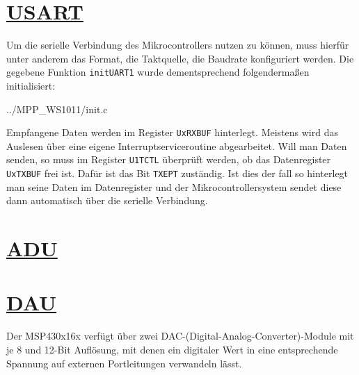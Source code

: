 \documentclass[11pt,german]{scrartcl}
\begin{document}





\clearpage
\section
{\href{http://cst.mi.fu-berlin.de/intern/19606-P-MPP/Aufgaben/040700.html}
{USART}}

Um die serielle Verbindung des Mikrocontrollers nutzen zu können, muss hierfür unter anderem das Format, die Taktquelle, die Baudrate konfiguriert werden. Die gegebene Funktion \texttt{initUART1} wurde dementsprechend folgendermaßen initialisiert:

{../MPP_WS1011/init.c}

Empfangene Daten werden im Register \texttt{UxRXBUF} hinterlegt. Meistens wird das Auslesen über eine eigene Interruptserviceroutine abgearbeitet. Will man Daten senden, so muss im Register \texttt{U1TCTL} überprüft werden, ob das Datenregister \texttt{UxTXBUF} frei ist. Dafür ist das Bit \texttt{TXEPT} zuständig. Ist dies der fall so hinterlegt man seine Daten im Datenregister und der Mikrocontrollersystem sendet diese dann automatisch über die serielle Verbindung.





\clearpage
\section
{\href{http://cst.mi.fu-berlin.de/intern/19606-P-MPP/Aufgaben/040800.html}
{ADU}}




\clearpage
\section
{\href{http://cst.mi.fu-berlin.de/intern/19606-P-MPP/Aufgaben/040900.html}
{DAU}}

Der MSP430x16x verfügt über zwei DAC-(Digital-Analog-Converter)-Module
mit je 8 und 12-Bit Auflösung, mit denen ein digitaler Wert in eine entsprechende
Spannung auf externen Portleitungen verwandeln lässt.
\end{document}
